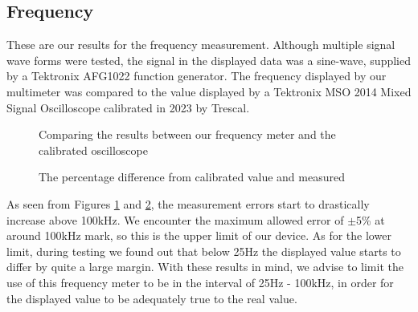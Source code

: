 \subsection{Frequency}
\label{sec:results_frequency}
These are our results for the frequency measurement. Although multiple signal wave forms were tested, the signal in the displayed data was a sine-wave, supplied by a Tektronix AFG1022 function generator. The frequency displayed by our multimeter was compared to the value displayed by a Tektronix MSO 2014 Mixed Signal Oscilloscope calibrated in 2023 by Trescal.

\begin{figure}[h]
    \centering
    \caption{Comparing the results between our frequency meter and the calibrated oscilloscope}
    \label{fig:freqGraph}
    
\end{figure}

\begin{figure}[h]
    \centering
    \caption{The percentage difference from calibrated value and measured}
    \label{fig:freqGraphDiff}
\end{figure}

As seen from Figures \ref{fig:freqGraph} and \ref{fig:freqGraphDiff}, the measurement errors start to drastically increase above 100kHz. We encounter the maximum allowed error of $\pm$5\% at around 100kHz mark, so this is the upper limit of our device. As for the lower limit, during testing we found out that below 25Hz the displayed value starts to differ by quite a large margin. With these results in mind, we advise to limit the use of this frequency meter to be in the interval of 25Hz - 100kHz, in order for the displayed value to be adequately true to the real value.
\FloatBarrier